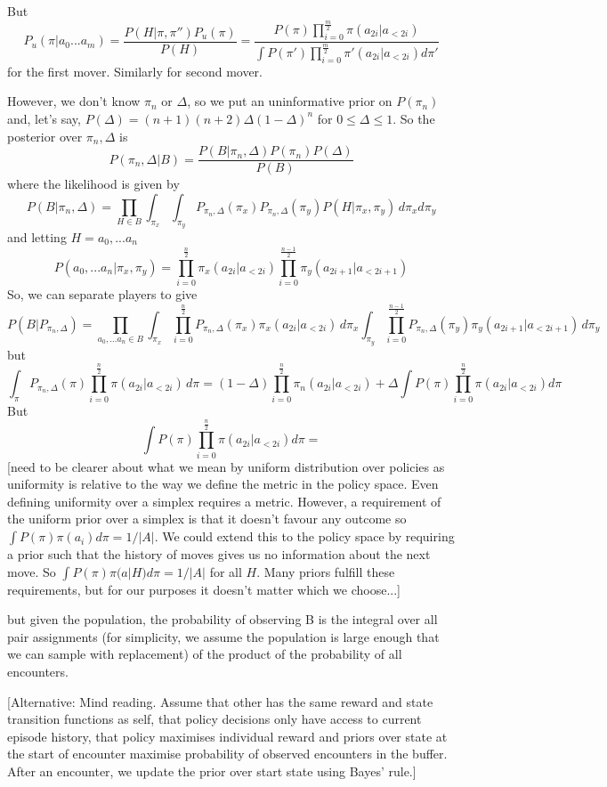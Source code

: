 \documentclass[a4paper]{report}
\begin{document}
But
\[
P_u(\pi|a_0...a_m) = \frac{P(H|\pi,\pi'')P_u(\pi)}{P(H)} = \frac{
	P(\pi)\prod_{i=0}^{\frac{m}{2}} \pi(a_{2i}|a_{<2i})
	}{
	\int P(\pi')\prod_{i=0}^{\frac{m}{2}} \pi'(a_{2i}|a_{<2i}) d\pi'
}
\]
for the first mover. Similarly for second mover.

However, we don't know $\pi_n$ or $\Delta$, so we put an uninformative prior on $P(\pi_n)$ and, let's say, $P(\Delta) = (n+1)(n+2)\Delta(1-\Delta)^n$ for $0 \le \Delta \le 1$. So the posterior over $\pi_n, \Delta$ is
\[
P(\pi_n,\Delta|B) = \frac{P(B|\pi_n,\Delta)P(\pi_n)P(\Delta)}{P(B)}
\]
where the likelihood is given by
\[
P(B|\pi_n,\Delta) = \prod_{H\in B} \int_{\pi_x}  \int_{\pi_y} P_{\pi_n,\Delta}(\pi_x) P_{\pi_n,\Delta}(\pi_y) P(H|\pi_x,\pi_y)
\, d\pi_x d\pi_y
\]
and letting $H=a_0,...a_n$
\[
P(a_0,...a_n|\pi_x,\pi_y) = \prod_{i=0}^{\frac{n}{2}} \pi_x(a_{2i}|a_{<2i}) \prod_{i=0}^{\frac{n-1}{2}} \pi_y(a_{2i+1}|a_{<2i+1})
\]
So, we can separate players to give
\[
P(B|P_{\pi_n,\Delta}) = \prod_{a_0,...a_n\in B}
\int_{\pi_x} \prod_{i=0}^{\frac{n}{2}} P_{\pi_n,\Delta}(\pi_x)  \pi_x(a_{2i}|a_{<2i})\, d\pi_x
\int_{\pi_y} \prod_{i=0}^{\frac{n-1}{2}} P_{\pi_n,\Delta}(\pi_y)  \pi_y(a_{2i+1}|a_{<2i+1}) \,  d\pi_y
\]
but
\[
\int_\pi P_{\pi_n,\Delta}(\pi)  \prod_{i=0}^{\frac{n}{2}} \pi(a_{2i}|a_{<2i})\, d\pi = (1-\Delta) \prod_{i=0}^{\frac{n}{2}} \pi_n(a_{2i}|a_{<2i}) + \Delta \int P(\pi) \prod_{i=0}^{\frac{n}{2}} \pi(a_{2i}|a_{<2i}) d\pi
\]
But
\[
\int P(\pi) \prod_{i=0}^{\frac{n}{2}} \pi(a_{2i}|a_{<2i}) d\pi = 
\]
[need to be clearer about what we mean by uniform distribution over policies as uniformity is relative to the way we define the metric in the policy space. Even defining uniformity over a simplex requires a metric. However, a requirement of the uniform prior over a simplex is that it doesn't favour any outcome so $\int P(\pi)\pi(a_i) d\pi = 1/|A|$. We could extend this to the policy space by requiring a prior such that the history of moves gives us no information about the next move. So $\int P(\pi)\pi(a|H) d\pi = 1/|A|$ for all $H$. Many priors fulfill these requirements, but for our purposes it doesn't matter which we choose...]

but given the population, the probability of observing B is the integral over all pair assignments (for simplicity, we assume the population is large enough that we can sample with replacement) of the product of the probability of all encounters.



[Alternative: Mind reading. Assume that other has the same reward and state transition functions as self, that policy decisions only have access to current episode history, that policy maximises individual reward and priors over state at the start of encounter maximise probability of observed encounters in the buffer. After an encounter, we update the prior over start state using Bayes' rule.]
\end{document}
